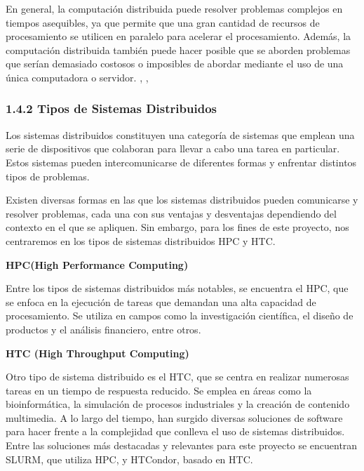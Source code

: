 \begin{spacing}{1.5}
  En general, la computación distribuida puede resolver problemas complejos en tiempos asequibles, ya que permite que una gran cantidad de recursos de procesamiento se utilicen en paralelo para acelerar el procesamiento. Además, la computación distribuida también puede hacer posible que se aborden problemas que serían demasiado costosos o imposibles de abordar mediante el uso de una única computadora o servidor. \cite{distributed-1}, \cite{distributed-4}, \cite{distributed-3}

  \subsubsection{1.4.2 Tipos de Sistemas Distribuidos}

  Los sistemas distribuidos constituyen una categoría de sistemas que emplean una serie de dispositivos que colaboran para llevar a cabo una tarea en particular. Estos sistemas pueden intercomunicarse de diferentes formas y enfrentar distintos tipos de problemas.

  Existen diversas formas en las que los sistemas distribuidos pueden comunicarse y resolver problemas, cada una con sus ventajas y desventajas dependiendo del contexto en el que se apliquen. Sin embargo, para los fines de este proyecto, nos centraremos en los tipos de sistemas distribuidos HPC y HTC.
  \vspace{3mm}

  \textbf{HPC(High Performance Computing)}

  Entre los tipos de sistemas distribuidos más notables, se encuentra el HPC, que se enfoca en la ejecución de tareas que demandan una alta capacidad de procesamiento. Se utiliza en campos como la investigación científica, el diseño de productos y el análisis financiero, entre otros.

  \textbf{HTC (High Throughput Computing)}

  Otro tipo de sistema distribuido es el HTC, que se centra en realizar numerosas tareas en un tiempo de respuesta reducido. Se emplea en áreas como la bioinformática, la simulación de procesos industriales y la creación de contenido multimedia.
  A lo largo del tiempo, han surgido diversas soluciones de software para hacer frente a la complejidad que conlleva el uso de sistemas distribuidos. Entre las soluciones más destacadas y relevantes para este proyecto se encuentran SLURM, que utiliza HPC, y HTCondor, basado en HTC.  \vspace{3mm}


\end{spacing}
